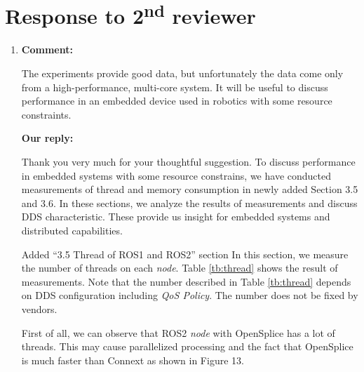 \documentclass{article}
\newcommand\nd{\textsuperscript{nd}\xspace}
\begin{document}
\newpage

\section{Response to 2\nd reviewer}
\begin{enumerate}

\item \begin{flushleft}
  \textbf{Comment:}
\end{flushleft}
  The experiments provide good data, but unfortunately the data come only from a high-performance, multi-core system. 
  It will be useful to discuss performance in an embedded device used in robotics with some resource constraints.

  \begin{flushleft}
    \textbf{Our reply:}
  \end{flushleft}
  Thank you very much for your thoughtful suggestion.
  To discuss performance in embedded systems with some resource constrains, we have conducted measurements of thread and memory consumption in newly added Section 3.5 and 3.6.
  In these sections, we analyze the results of measurements and discuss DDS characteristic.
  These provide us insight for embedded systems and distributed capabilities.
  \begin{itembox}[|]{Added ``3.5 Thread of ROS1 and ROS2'' section}
    In this section, we measure the number of threads on each \emph{node}.
    Table \ref{tb:thread} shows the result of measurements.
    Note that the number described in Table \ref{tb:thread} depends on DDS configuration including \emph{QoS Policy}.
    The number does not be fixed by vendors.

    First of all, we can observe that ROS2 \emph{node} with OpenSplice has a lot of threads.
    This may cause parallelized processing and the fact that OpenSplice is much faster than Connext as shown in Figure 13.


\end{itembox}
\end{enumerate}
\end{document}
